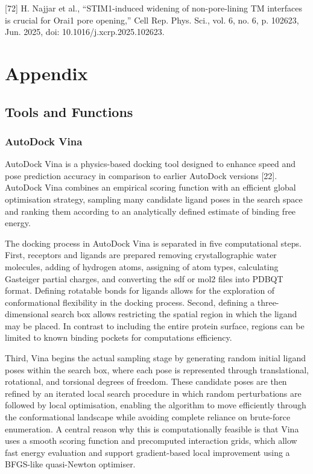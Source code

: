 {[}72{]} H. Najjar et al., ``STIM1-induced widening of non-pore-lining TM interfaces is crucial for Orai1 pore opening,'' Cell Rep. Phys. Sci., vol. 6, no. 6, p. 102623, Jun. 2025, doi: 10.1016/j.xcrp.2025.102623.

\hypertarget{appendix}{%
\chapter{Appendix}\label{appendix}}

\hypertarget{tools-and-functions}{%
\section{Tools and Functions}\label{tools-and-functions}}

\hypertarget{autodock-vina-1}{%
\subsection{AutoDock Vina}\label{autodock-vina-1}}

AutoDock Vina is a physics-based docking tool designed to enhance speed and pose prediction accuracy in comparison to earlier AutoDock versions {[}22{]}. AutoDock Vina combines an empirical scoring function with an efficient global optimisation strategy, sampling many candidate ligand poses in the search space and ranking them according to an analytically defined estimate of binding free energy.

The docking process in AutoDock Vina is separated in five computational steps. First, receptors and ligands are prepared removing crystallographic water molecules, adding of hydrogen atoms, assigning of atom types, calculating Gasteiger partial charges, and converting the sdf or mol2 files into PDBQT format. Defining rotatable bonds for ligands allows for the exploration of conformational flexibility in the docking process. Second, defining a three-dimensional search box allows restricting the spatial region in which the ligand may be placed. In contrast to including the entire protein surface, regions can be limited to known binding pockets for computations efficiency.

Third, Vina begins the actual sampling stage by generating random initial ligand poses within the search box, where each pose is represented through translational, rotational, and torsional degrees of freedom. These candidate poses are then refined by an iterated local search procedure in which random perturbations are followed by local optimisation, enabling the algorithm to move efficiently through the conformational landscape while avoiding complete reliance on brute-force enumeration. A central reason why this is computationally feasible is that Vina uses a smooth scoring function and precomputed interaction grids, which allow fast energy evaluation and support gradient-based local improvement using a BFGS-like quasi-Newton optimiser.


